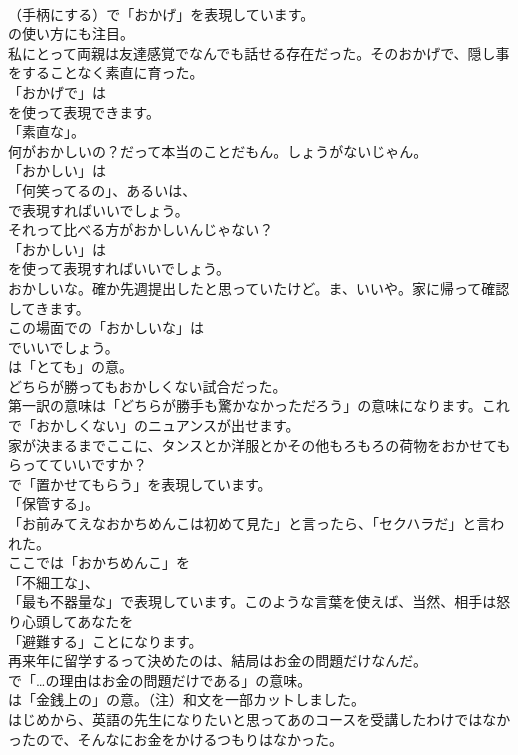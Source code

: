 \documentclass[8pt]{extreport}
\begin{document}
\begin{CJK}{UTF8}{min}
\\	（手柄にする）で「おかげ」を表現しています。
\\	の使い方にも注目。	
\\	私にとって両親は友達感覚でなんでも話せる存在だった。そのおかげで、隠し事をすることなく素直に育った。 
\\	「おかげで」は
\\	を使って表現できます。
\\	「素直な」。	
\\	何がおかしいの？だって本当のことだもん。しょうがないじゃん。 
\\	「おかしい」は
\\	「何笑ってるの」、あるいは、
\\	で表現すればいいでしょう。	
\\	それって比べる方がおかしいんじゃない？ 
\\	「おかしい」は
\\	を使って表現すればいいでしょう。	
\\	おかしいな。確か先週提出したと思っていたけど。ま、いいや。家に帰って確認してきます。 
\\	この場面での「おかしいな」は
\\	でいいでしょう。
\\	は「とても」の意。	
\\	どちらが勝ってもおかしくない試合だった。 
\\	第一訳の意味は「どちらが勝手も驚かなかっただろう」の意味になります。これで「おかしくない」のニュアンスが出せます。	
\\	家が決まるまでここに、タンスとか洋服とかその他もろもろの荷物をおかせてもらってていいですか？ 
\\	で「置かせてもらう」を表現しています。
\\	「保管する」。	
\\	「お前みてえなおかちめんこは初めて見た」と言ったら、「セクハラだ」と言われた。 
\\	ここでは「おかちめんこ」を
\\	「不細工な」、
\\	「最も不器量な」で表現しています。このような言葉を使えば、当然、相手は怒り心頭してあなたを
\\	「避難する」ことになります。	
\\	再来年に留学するって決めたのは、結局はお金の問題だけなんだ。 
\\	で「…の理由はお金の問題だけである」の意味。
\\	は「金銭上の」の意。（注）和文を一部カットしました。	
\\	はじめから、英語の先生になりたいと思ってあのコースを受講したわけではなかったので、そんなにお金をかけるつもりはなかった。 

\end{CJK}
\end{document}
